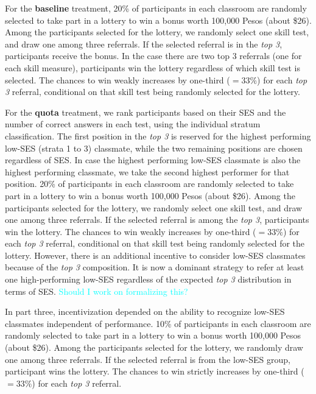 \documentclass[11pt,a4paper,oneside]{article}
\begin{document}
For the \textbf{baseline} treatment, 20\% of participants in each classroom are randomly selected to take part in a lottery to win a bonus worth 100,000 Pesos (about \$26). Among the participants selected for the lottery, we randomly select one skill test, and draw one among three referrals. If the selected referral is in the \textit{top 3}, participants receive the bonus. In the case there are two top 3 referrals (one for each skill measure), participants win the lottery regardless of which skill test is selected. The chances to win weakly increases by one-third ($=33\%$) for each \textit{top 3} referral, conditional on that skill test being randomly selected for the lottery. 

For the \textbf{quota} treatment, we rank participants based on their SES and the number of correct answers in each test, using the individual stratum classification. The first position in the \textit{top 3} is reserved for the highest performing low-SES (strata 1 to 3) classmate, while the two remaining positions are chosen regardless of SES. In case the highest performing low-SES classmate is also the highest performing classmate, we take the second highest performer for that position. 20\% of participants in each classroom are randomly selected to take part in a lottery to win a bonus worth 100,000 Pesos (about \$26). Among the participants selected for the lottery, we randomly select one skill test, and draw one among three referrals. If the selected referral is among the \textit{top 3}, participants win the lottery. The chances to win weakly increases by one-third ($=33\%$) for each \textit{top 3} referral, conditional on that skill test being randomly selected for the lottery. However, there is an additional incentive to consider low-SES classmates because of the \textit{top 3} composition. It is now a dominant strategy to refer at least one high-performing low-SES regardless of the expected \textit{top 3} distribution in terms of SES. \textcolor{cyan}{Should I work on formalizing this?}

In part three, incentivization depended on the ability to recognize low-SES classmates independent of performance. 10\% of participants in each classroom are randomly selected to take part in a lottery to win a bonus worth 100,000 Pesos (about \$26). Among the participants selected for the lottery, we randomly draw one among three referrals. If the selected referral is from the low-SES group, participant wins the lottery. The chances to win strictly increases by one-third ($=33\%$) for each \textit{top 3} referral.
\end{document}
